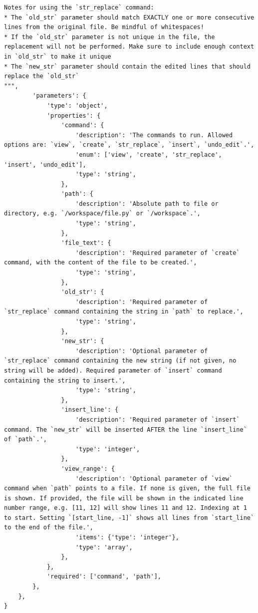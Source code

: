{\begin{Verbatim}[breaklines, breakanywhere]
Notes for using the `str_replace` command:
* The `old_str` parameter should match EXACTLY one or more consecutive lines from the original file. Be mindful of whitespaces!
* If the `old_str` parameter is not unique in the file, the replacement will not be performed. Make sure to include enough context in `old_str` to make it unique
* The `new_str` parameter should contain the edited lines that should replace the `old_str`
""",
        'parameters': {
            'type': 'object',
            'properties': {
                'command': {
                    'description': 'The commands to run. Allowed options are: `view`, `create`, `str_replace`, `insert`, `undo_edit`.',
                    'enum': ['view', 'create', 'str_replace', 'insert', 'undo_edit'],
                    'type': 'string',
                },
                'path': {
                    'description': 'Absolute path to file or directory, e.g. `/workspace/file.py` or `/workspace`.',
                    'type': 'string',
                },
                'file_text': {
                    'description': 'Required parameter of `create` command, with the content of the file to be created.',
                    'type': 'string',
                },
                'old_str': {
                    'description': 'Required parameter of `str_replace` command containing the string in `path` to replace.',
                    'type': 'string',
                },
                'new_str': {
                    'description': 'Optional parameter of `str_replace` command containing the new string (if not given, no string will be added). Required parameter of `insert` command containing the string to insert.',
                    'type': 'string',
                },
                'insert_line': {
                    'description': 'Required parameter of `insert` command. The `new_str` will be inserted AFTER the line `insert_line` of `path`.',
                    'type': 'integer',
                },
                'view_range': {
                    'description': 'Optional parameter of `view` command when `path` points to a file. If none is given, the full file is shown. If provided, the file will be shown in the indicated line number range, e.g. [11, 12] will show lines 11 and 12. Indexing at 1 to start. Setting `[start_line, -1]` shows all lines from `start_line` to the end of the file.',
                    'items': {'type': 'integer'},
                    'type': 'array',
                },
            },
            'required': ['command', 'path'],
        },
    },
}


\end{Verbatim}}
